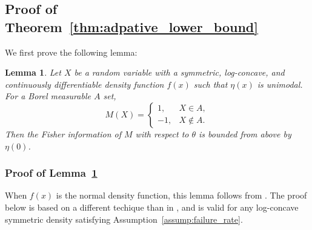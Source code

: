 \documentclass[letterpaper, 11pt]{IEEEtran}      %
\newtheorem{lem}[thm]{\bf {Lemma}}
\begin{document}
\subsection{Proof of Theorem~\ref{thm:adpative_lower_bound}
\label{proof:thm:adpative_lower_bound}
}

We first prove the following lemma:
\begin{lem} \label{lem:fisher_bound}
Let $X$ be a random variable with a symmetric, log-concave, and continuously differentiable density function $f(x)$ such that $\eta(x)$ is unimodal. For a Borel measurable $A$ set, 
\[
M(X) = \begin{cases} 1,& X \in A, \\
-1, & X \notin A.
\end{cases}
\]
Then the Fisher information of $M$ with respect to $\theta$ is bounded from above by $\eta(0)$.
\end{lem}

\subsubsection*{Proof of Lemma~\ref{lem:fisher_bound}}
When $f(x)$ is the normal density function, this lemma follows from \cite[Thm. 3]{Barnes2018}. The proof below is based on a different techique than in \cite{Barnes2018}, and is valid for any log-concave symmetric density satisfying Assumption~\ref{assump:failure_rate}. \\
\end{document}

